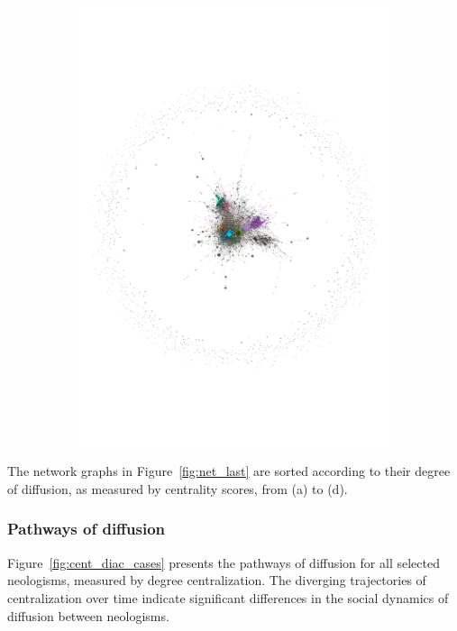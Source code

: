 \documentclass[
  a4paper,
  abstract=on,
  captions=tableabove
  ]{scrartcl}
\begin{document}
\begin{figure}
\begin{subfigure}{.45\linewidth}
          \includegraphics[width=\linewidth, height=\textheight, keepaspectratio]{img/net_alt-left_four.pdf}
        \end{subfigure}
      \end{figure}

      The network graphs in Figure~\ref{fig:net_last} are sorted according to their degree of diffusion, as measured by centrality scores, from (a) to (d).

      

    \subsubsection{Pathways of diffusion}

      Figure~\ref{fig:cent_diac_cases} presents the pathways of diffusion for all selected neologisms, measured by degree centralization. The diverging trajectories of centralization over time indicate significant differences in the social dynamics of diffusion between neologisms.
\end{document}
